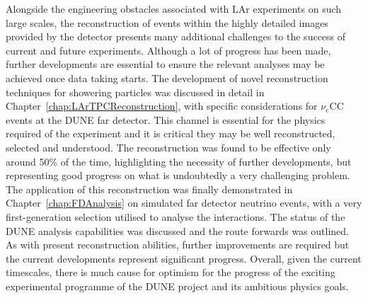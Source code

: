 Alongside the engineering obstacles associated with LAr experiments on such large scales, the reconstruction of events within the highly detailed images provided by the detector presents many additional challenges to the success of current and future experiments.  Although a lot of progress has been made, further developments are essential to ensure the relevant analyses may be achieved once data taking starts.  The development of novel reconstruction techniques for showering particles was discussed in detail in Chapter~\ref{chap:LArTPCReconstruction}, with specific considerations for $\nu_e$CC events at the DUNE far detector.  This channel is essential for the physics required of the experiment and it is critical they may be well reconstructed, selected and understood.  The reconstruction was found to be effective only around 50\% of the time, highlighting the necessity of further developments, but representing good progress on what is undoubtedly a very challenging problem.  The application of this reconstruction was finally demonstrated in Chapter~\ref{chap:FDAnalysis} on simulated far detector neutrino events, with a very first-generation selection utilised to analyse the interactions.  The status of the DUNE analysis capabilities was discussed and the route forwards was outlined.  As with present reconstruction abilities, further improvements are required but the current developments represent significant progress.  Overall, given the current timescales, there is much cause for optimism for the progress of the exciting experimental programme of the DUNE project and its ambitious physics goals.

